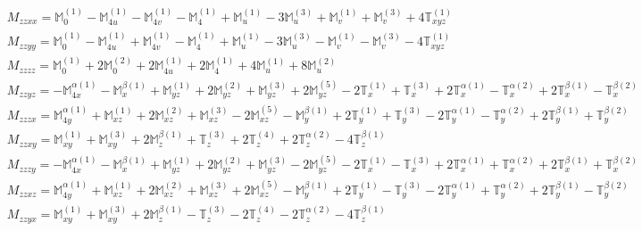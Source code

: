 \documentclass[fleqn,8pt,landscape]{jsarticle}
\begin{document}
\begin{align*}
& M_{zzxx} = \mathbb{M}_{0}^{(1)} - \mathbb{M}_{4u}^{(1)} - \mathbb{M}_{4v}^{(1)} - \mathbb{M}_{4}^{(1)} + \mathbb{M}_{u}^{(1)} - 3 \mathbb{M}_{u}^{(3)} + \mathbb{M}_{v}^{(1)} + \mathbb{M}_{v}^{(3)} + 4 \mathbb{T}_{xyz}^{(1)} \\
& M_{zzyy} = \mathbb{M}_{0}^{(1)} - \mathbb{M}_{4u}^{(1)} + \mathbb{M}_{4v}^{(1)} - \mathbb{M}_{4}^{(1)} + \mathbb{M}_{u}^{(1)} - 3 \mathbb{M}_{u}^{(3)} - \mathbb{M}_{v}^{(1)} - \mathbb{M}_{v}^{(3)} - 4 \mathbb{T}_{xyz}^{(1)} \\
& M_{zzzz} = \mathbb{M}_{0}^{(1)} + 2 \mathbb{M}_{0}^{(2)} + 2 \mathbb{M}_{4u}^{(1)} + 2 \mathbb{M}_{4}^{(1)} + 4 \mathbb{M}_{u}^{(1)} + 8 \mathbb{M}_{u}^{(2)} \\
& M_{zzyz} = - \mathbb{M}_{4x}^{\alpha(1)} - \mathbb{M}_{x}^{\beta(1)} + \mathbb{M}_{yz}^{(1)} + 2 \mathbb{M}_{yz}^{(2)} + \mathbb{M}_{yz}^{(3)} + 2 \mathbb{M}_{yz}^{(5)} - 2 \mathbb{T}_{x}^{(1)} + \mathbb{T}_{x}^{(3)} + 2 \mathbb{T}_{x}^{\alpha(1)} - \mathbb{T}_{x}^{\alpha(2)} + 2 \mathbb{T}_{x}^{\beta(1)} - \mathbb{T}_{x}^{\beta(2)} \\
& M_{zzzx} = \mathbb{M}_{4y}^{\alpha(1)} + \mathbb{M}_{xz}^{(1)} + 2 \mathbb{M}_{xz}^{(2)} + \mathbb{M}_{xz}^{(3)} - 2 \mathbb{M}_{xz}^{(5)} - \mathbb{M}_{y}^{\beta(1)} + 2 \mathbb{T}_{y}^{(1)} + \mathbb{T}_{y}^{(3)} - 2 \mathbb{T}_{y}^{\alpha(1)} - \mathbb{T}_{y}^{\alpha(2)} + 2 \mathbb{T}_{y}^{\beta(1)} + \mathbb{T}_{y}^{\beta(2)} \\
& M_{zzxy} = \mathbb{M}_{xy}^{(1)} + \mathbb{M}_{xy}^{(3)} + 2 \mathbb{M}_{z}^{\beta(1)} + \mathbb{T}_{z}^{(3)} + 2 \mathbb{T}_{z}^{(4)} + 2 \mathbb{T}_{z}^{\alpha(2)} - 4 \mathbb{T}_{z}^{\beta(1)} \\
& M_{zzzy} = - \mathbb{M}_{4x}^{\alpha(1)} - \mathbb{M}_{x}^{\beta(1)} + \mathbb{M}_{yz}^{(1)} + 2 \mathbb{M}_{yz}^{(2)} + \mathbb{M}_{yz}^{(3)} - 2 \mathbb{M}_{yz}^{(5)} - 2 \mathbb{T}_{x}^{(1)} - \mathbb{T}_{x}^{(3)} + 2 \mathbb{T}_{x}^{\alpha(1)} + \mathbb{T}_{x}^{\alpha(2)} + 2 \mathbb{T}_{x}^{\beta(1)} + \mathbb{T}_{x}^{\beta(2)} \\
& M_{zzxz} = \mathbb{M}_{4y}^{\alpha(1)} + \mathbb{M}_{xz}^{(1)} + 2 \mathbb{M}_{xz}^{(2)} + \mathbb{M}_{xz}^{(3)} + 2 \mathbb{M}_{xz}^{(5)} - \mathbb{M}_{y}^{\beta(1)} + 2 \mathbb{T}_{y}^{(1)} - \mathbb{T}_{y}^{(3)} - 2 \mathbb{T}_{y}^{\alpha(1)} + \mathbb{T}_{y}^{\alpha(2)} + 2 \mathbb{T}_{y}^{\beta(1)} - \mathbb{T}_{y}^{\beta(2)} \\
& M_{zzyx} = \mathbb{M}_{xy}^{(1)} + \mathbb{M}_{xy}^{(3)} + 2 \mathbb{M}_{z}^{\beta(1)} - \mathbb{T}_{z}^{(3)} - 2 \mathbb{T}_{z}^{(4)} - 2 \mathbb{T}_{z}^{\alpha(2)} - 4 \mathbb{T}_{z}^{\beta(1)} \\

\end{align*}
\end{document}
